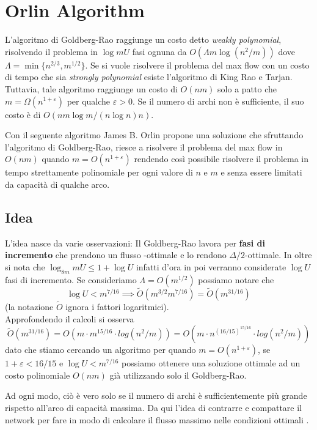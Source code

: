 
\chapter{Orlin Algorithm} \label{chap:Orlin}

L'algoritmo di Goldberg-Rao raggiunge un costo detto \textit{weakly polynomial}, risolvendo il problema in $\log mU$ fasi ognuna da $O(\Lambda m \log(n^2/m))$ dove $\Lambda = \min \{n^{2/3}, m^{1/2}\}$.
Se si vuole risolvere il problema del max flow con un costo di tempo che sia \textit{strongly polynomial} esiste l'algoritmo di King Rao e Tarjan. Tuttavia, tale algoritmo raggiunge un costo di $O(nm)$ solo a patto che $ m = \Omega (n^{1+\varepsilon})$ per qualche $\varepsilon > 0$. 
Se il numero di archi non è sufficiente, il suo costo è di $O(nm \log m/(n \log n) n)$.

Con il seguente algoritmo James B. Orlin propone una soluzione che sfruttando l'algoritmo di Goldberg-Rao, riesce a risolvere il problema del max flow in $O(nm)$ quando $m = O(n^{1+\varepsilon})$ rendendo così possibile risolvere il problema in tempo strettamente polinomiale per ogni valore di $n$ e $m$ e senza essere limitati da capacità di qualche arco.

\section{Idea}
L'idea nasce da varie osservazioni:
Il Goldberg-Rao lavora per \textbf{fasi di incremento} che prendono un flusso \dlt-ottimale e lo rendono $\Delta/2$-ottimale. 
In oltre si nota che $\log_{8m} mU \le 1 + \log U$ infatti d'ora in poi verranno considerate $\log U$ fasi di incremento.
Se consideriamo $\Lambda = O(m^{1/2})$ possiamo notare che \[\log U < m^{7/16} \implies \tilde{O}(m^{3/2}m^{7/16}) = \tilde{O}(m^{31/16})\] 
(la notazione $\tilde{O}$ ignora i fattori logaritmici).\\
Approfondendo il calcoli si osserva 
\[\tilde{O}(m^{31/16}) = O(m\cdot m^{15/16}\cdot log(n^2/m)) = O(m\cdot n^{(16/15)^{15/16}}\cdot log(n^2/m)) \]
dato che stiamo cercando un algoritmo per quando $m = O(n^{1+\varepsilon})$, se $1+\varepsilon < 16/15$ e $\log U < m^{7/16}$ possiamo ottenere una soluzione ottimale ad un costo polinomiale $O(nm)$ già utilizzando solo il Goldberg-Rao.

Ad ogni modo, ciò è vero solo se il numero di archi è sufficientemente più grande rispetto all'arco di capacità massima.
Da qui l'idea di contrarre e compattare il network per fare in modo di calcolare il flusso massimo nelle condizioni ottimali . 

